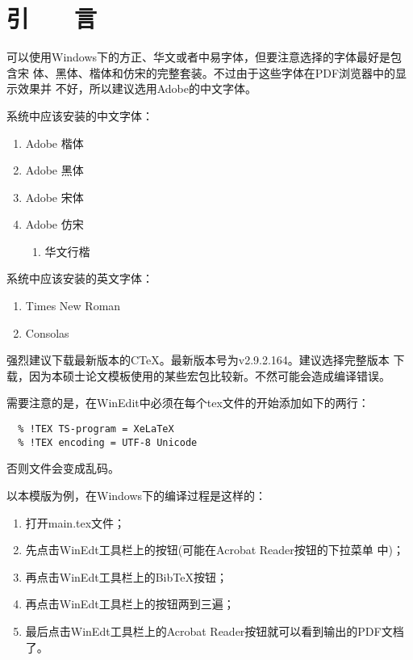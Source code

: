 \chapter*{\hfill 引　　言 \hfill}


可以使用Windows下的方正、华文或者中易字体，但要注意选择的字体最好是包含宋
体、黑体、楷体和仿宋的完整套装。不过由于这些字体在PDF浏览器中的显示效果并
不好，所以建议选用Adobe的中文字体。

系统中应该安装的中文字体：
\begin{enumerate}
\item Adobe 楷体
\item Adobe 黑体
\item Adobe 宋体
\item Adobe 仿宋
\begin{enumerate}
\item 华文行楷
\end{enumerate}
\end{enumerate}

系统中应该安装的英文字体：
\begin{enumerate}
\item Times New Roman
\item Consolas
\end{enumerate}


强烈建议下载最新版本的C\TeX{}。最新版本号为v2.9.2.164。建议选择完整版本
下载，因为本硕士论文模板使用的某些宏包比较新。不然可能会造成编译错误。


需要注意的是，在WinEdit中必须在每个tex文件的开始添加如下的两行：
\begin{lstlisting}
  % !TEX TS-program = XeLaTeX
  % !TEX encoding = UTF-8 Unicode
\end{lstlisting}
否则文件会变成乱码。

以本模版为例，在Windows下的编译过程是这样的：
\begin{enumerate}
\item 打开main.tex文件；
\item 先点击WinEdt工具栏上的\XeLaTeX{}按钮(可能在Acrobat Reader按钮的下拉菜单
  中)；
\item 再点击WinEdt工具栏上的Bib\TeX{}按钮；
\item 再点击WinEdt工具栏上的\XeLaTeX{}按钮两到三遍；
\item 最后点击WinEdt工具栏上的Acrobat Reader按钮就可以看到输出的PDF文档了。
\end{enumerate}


